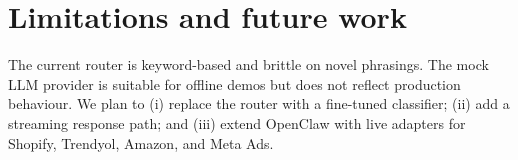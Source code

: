 \documentclass[11pt,a4paper]{article}
\begin{document}
\section{Limitations and future work}

The current router is keyword-based and brittle on novel phrasings. The mock
LLM provider is suitable for offline demos but does not reflect production
behaviour. We plan to (i) replace the router with a fine-tuned classifier; (ii)
add a streaming response path; and (iii) extend OpenClaw with live adapters for
Shopify, Trendyol, Amazon, and Meta Ads.



\end{document}
